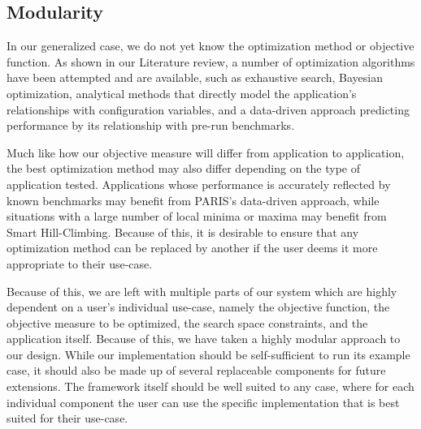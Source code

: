 \documentclass{report}
\begin{document}
\subsection{Modularity}
In our generalized case, we do not yet know the optimization method or objective function. As shown in our Literature review, a number of optimization algorithms have been attempted and are available, such as exhaustive search, Bayesian optimization\cite{Alipourfard2017}, analytical methods that directly model the application's relationships with configuration variables\cite{Venkataraman2016}, and a data-driven approach predicting performance by its relationship with pre-run benchmarks\cite{Yadwadkar2017}.

Much like how our objective measure will differ from application to application, the best optimization method may also differ depending on the type of application tested. Applications whose performance is accurately reflected by known benchmarks may benefit from PARIS's data-driven approach, while situations with a large number of local minima or maxima may benefit from Smart Hill-Climbing. Because of this, it is desirable to ensure that any optimization method can be replaced by another if the user deems it more appropriate to their use-case.

Because of this, we are left with multiple parts of our system which are highly dependent on a user's individual use-case, namely the objective function, the objective measure to be optimized, the search space constraints, and the application itself. Because of this, we have taken a highly modular approach to our design. While our implementation should be self-sufficient to run its example case, it should also be made up of several replaceable components for future extensions. The framework itself should be well suited to any case, where for each individual component the user can use the specific implementation that is best suited for their use-case.
 
\end{document}
